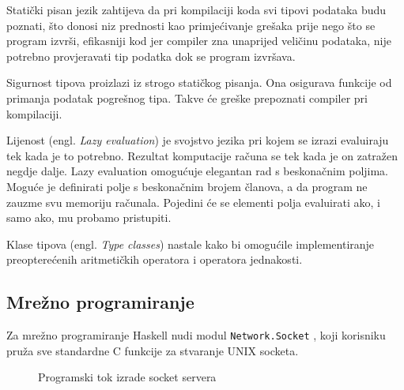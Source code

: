 Statički pisan jezik zahtijeva da pri kompilaciji koda svi tipovi podataka budu
poznati, što donosi niz prednosti kao primjećivanje grešaka prije nego što se
program izvrši, efikasniji kod jer compiler zna unaprijed veličinu podataka,
nije potrebno provjeravati tip podatka dok se program izvršava.

Sigurnost tipova proizlazi iz strogo statičkog pisanja. Ona osigurava
funkcije od primanja podatak pogrešnog tipa. Takve će greške prepoznati compiler pri
kompilaciji.

Lijenost (engl. \emph{Lazy evaluation}) je svojstvo jezika pri kojem se izrazi
evaluiraju tek kada je to potrebno. Rezultat komputacije računa se tek kada je
on zatražen negdje dalje. Lazy evaluation omogućuje elegantan rad s beskonačnim
poljima. Moguće je definirati polje s beskonačnim brojem članova, a da program
ne zauzme svu memoriju računala. Pojedini će se elementi polja evaluirati ako, i
samo ako, mu probamo pristupiti.

Klase tipova (engl. \emph{Type classes}) nastale kako bi omogućile
implementiranje preopterećenih aritmetičkih operatora i operatora jednakosti.

\subsection{Mrežno programiranje}
\label{subsect:haskell_net}

Za mrežno programiranje Haskell nudi modul
\texttt{Network.Socket} \cite{network_socket}, koji korisniku
pruža sve standardne C funkcije za stvaranje UNIX socketa.

\begin{figure}[H]
\centering
{}
\caption{Programski tok izrade socket servera}
\label{fig:server_creation}
\end{figure}

